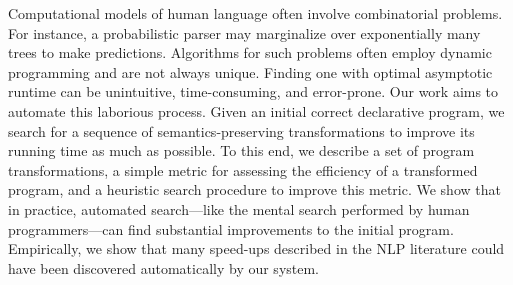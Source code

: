 Computational models of human language often involve combinatorial problems. For instance, a probabilistic parser may marginalize over exponentially many trees to make predictions.  Algorithms for such problems often employ dynamic programming and are not always unique.  Finding one with optimal asymptotic runtime can be unintuitive, time-consuming, and error-prone. Our work aims to automate this laborious process.  Given an initial correct declarative program, we search for a sequence of semantics-preserving transformations to improve its running time as much as possible. To this end, we describe a set of program transformations, a simple metric for assessing the efficiency of a transformed program, and a heuristic search procedure to improve this metric.  We show that in practice, automated search—like the mental search performed by human programmers—can find substantial improvements to the initial program. Empirically, we show that many speed-ups described in the NLP literature could have been discovered automatically by our system.
